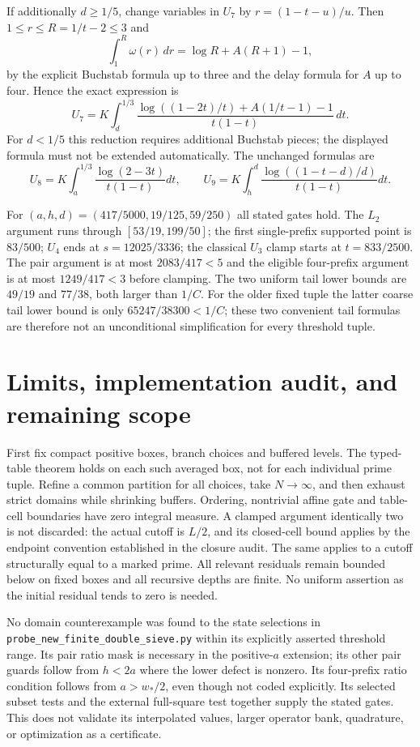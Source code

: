 \documentclass[11pt]{article}
\begin{document}
If additionally $d\ge1/5$, change variables in $U_7$ by
$r=(1-t-u)/u$. Then $1\le r\le R=1/t-2\le3$ and
\[
 \int_1^R\omega(r)\,dr=\log R+A(R+1)-1,
\]
by the explicit Buchstab formula up to three and the delay formula
for $A$ up to four. Hence the exact expression is
\[
 U_7=K\int_d^{1/3}
  \frac{\log((1-2t)/t)+A(1/t-1)-1}{t(1-t)}\,dt.
\]
For $d<1/5$ this reduction requires additional Buchstab pieces;
the displayed formula must not be extended automatically.
The unchanged formulas are
\[
 U_8=K\int_a^{1/3}\frac{\log(2-3t)}{t(1-t)}dt,\qquad
 U_9=K\int_h^d\frac{\log((1-t-d)/d)}{t(1-t)}dt.
\]

For $(a,h,d)=(417/5000,19/125,59/250)$ all stated gates hold.
The $L_2$ argument runs through $[53/19,199/50]$;
the first single-prefix supported point is $83/500$;
$U_4$ ends at $s=12025/3336$;
the classical $U_3$ clamp starts at $t=833/2500$.
The pair argument is at most $2083/417<5$ and the eligible
four-prefix argument is at most $1249/417<3$ before clamping.
The two uniform tail lower bounds are $49/19$ and $77/38$,
both larger than $1/C$.
For the older fixed tuple the latter coarse tail lower bound is
only $65247/38300<1/C$; these two convenient tail formulas are
therefore not an unconditional simplification for every threshold tuple.

\section*{Limits, implementation audit, and remaining scope}
First fix compact positive boxes, branch choices and buffered levels.
The typed-table theorem holds on each such averaged box, not for each
individual prime tuple. Refine a common partition for all choices,
take $N\to\infty$, and then exhaust strict domains while shrinking
buffers. Ordering, nontrivial affine gate and table-cell boundaries
have zero integral measure. A clamped argument identically two is
not discarded: the actual cutoff is $L/2$, and its closed-cell bound
applies by the endpoint convention established in the closure audit.
The same applies to a cutoff structurally equal to a marked prime.
All relevant residuals remain bounded below on fixed boxes and all
recursive depths are finite. No uniform assertion as the initial
residual tends to zero is needed.

No domain counterexample was found to the state selections in
\texttt{probe\_new\_finite\_double\_sieve.py} within its explicitly
asserted threshold range. Its pair ratio mask is necessary in the
positive-$a$ extension; its other pair guards follow from $h<2a$
where the lower defect is nonzero. Its four-prefix ratio condition
follows from $a>w_*/2$, even though not coded explicitly. Its selected
subset tests and the external full-square test together supply the
stated gates. This does not validate its interpolated values, larger
operator bank, quadrature, or optimization as a certificate.
\end{document}
